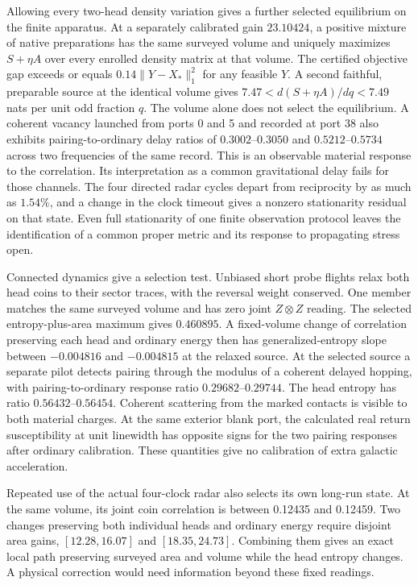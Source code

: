 \documentclass[11pt]{article}
\begin{document}
Allowing every two-head density variation gives a further selected
equilibrium on the finite apparatus. At a separately calibrated gain
$23.10424$, a positive mixture of native preparations has the same
surveyed volume and uniquely maximizes $S+\eta A$ over every enrolled
density matrix at that volume. The certified objective gap exceeds or
equals $0.14\|Y-X_*\|_1^2$ for any feasible $Y$. A second faithful,
preparable source at the identical volume gives
$7.47<d(S+\eta A)/dq<7.49$ nats per unit odd fraction $q$.
The volume alone does not select the equilibrium.
A coherent vacancy launched from ports 0 and 5 and recorded at port 38
also exhibits pairing-to-ordinary delay ratios of $0.3002$--$0.3050$
and $0.5212$--$0.5734$ across two frequencies of the same record.
This is an observable material response to the correlation. Its
interpretation as a common gravitational delay fails for those channels. The
four directed radar cycles depart from reciprocity by as much as
$1.54\%$, and a change in the clock timeout gives a nonzero
stationarity residual on that state. Even full stationarity of
one finite observation protocol leaves the identification of a
common proper metric and its response to propagating stress open.

Connected dynamics give a selection test. Unbiased short probe flights
relax both head coins to their sector traces, with the reversal
weight conserved. One member matches the same surveyed volume and
has zero joint $Z\otimes Z$ reading. The selected entropy-plus-area
maximum gives $0.460895$. A fixed-volume change of correlation
preserving each head and ordinary energy then has generalized-entropy
slope between $-0.004816$ and $-0.004815$ at the relaxed source.
At the selected source a separate pilot detects pairing through the
modulus of a coherent delayed hopping, with pairing-to-ordinary
response ratio $0.29682$--$0.29744$. The head entropy has ratio
$0.56432$--$0.56454$. Coherent scattering from the marked contacts is
visible to both material charges. At the same exterior blank port,
the calculated real return susceptibility at unit linewidth has
opposite signs for the two pairing responses after ordinary calibration.
These quantities give no calibration of extra galactic acceleration.

Repeated use of the actual four-clock radar also selects its own
long-run state. At the same volume, its joint coin correlation is
between 0.12435 and 0.12459. Two changes preserving both individual
heads and ordinary energy require disjoint area gains,
$[12.28,16.07]$ and $[18.35,24.73]$. Combining them gives an exact
local path preserving surveyed area and volume while the head
entropy changes. A physical correction would need information beyond
these fixed readings.
\end{document}
